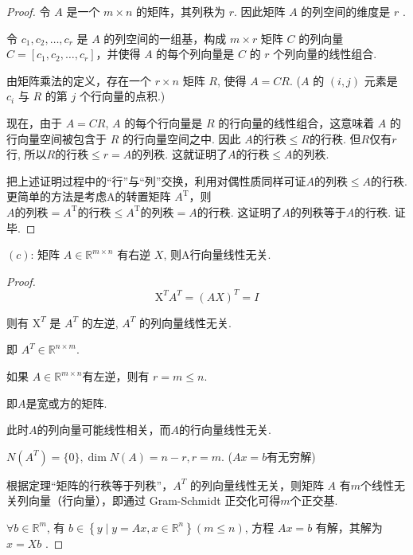 \begin{proof}
    令 $A$ 是一个 $m\times n$ 的矩阵，其列秩为 $r $. 因此矩阵 $A$ 的列空间的维度是 $r$ . 
    
    令 $c_1,c_2,\ldots,c_r$ 是 $A$ 的列空间的一组基，构成 $m \times r$ 矩阵 $C$ 的列向量 $C = [c_1,c_2,\ldots,c_r]$，并使得 $A$ 的每个列向量是 $C$ 的 $r$ 个列向量的线性组合. 
    
    由矩阵乘法的定义，存在一个 $r \times n$ 矩阵 $R$, 使得 $A = CR$. ($A$ 的 $(i,j)$ 元素是 $c_i$ 与 $R$ 的第 $j$ 个行向量的点积.)

现在，由于 $A = CR$, $A$ 的每个行向量是 $R$ 的行向量的线性组合，这意味着 $A$ 的行向量空间被包含于 $R$ 的行向量空间之中. 因此 $A 的行秩 \leq R的行秩$. 但$R$仅有$r$行, 所以$R的行秩 \leq r = A的列秩$. 这就证明了$A的行秩 \leq A的列秩$.

把上述证明过程中的“行”与“列”交换，利用对偶性质同样可证$A的列秩 \leq A的行秩$. 更简单的方法是考虑A的转置矩阵 $A^\mathrm{T}$，则$A的列秩 =  A^\mathrm{T}的行秩 \leq  A^\mathrm{T}的列秩 = A的行秩$. 这证明了$A$的列秩等于$A$的行秩. 证毕.
\end{proof}

\begin{theorem}
    $(c)$: 矩阵 $ A \in \mathbb{R}^{m \times n} $ 有右逆 $ X $, 则A行向量线性无关.
\end{theorem}

\begin{proof}
    $$ \mathrm{X}^{T} A^{T}=(A X)^{T}=I $$
    
    则有 $ \mathrm{X}^{T} $ 是 $ A^{T} $ 的左逆, $ A^{T} $ 的列向量线性无关.  

    即 $ A^{T} \in \mathbb{R}^{n \times m} $.
    
    \begin{corollary}
     如果 $ A \in \mathbb{R}^{m \times n} $有左逆，则有 $r= m \leq n  $. 

    即$A$是宽或方的矩阵. 

    此时$A$的列向量可能线性相关，而$A$的行向量线性无关. 
    
    $N(A^T) = \{0\}, \operatorname{dim} N(A) = n-r, r=m$. ($Ax=b$有无穷解) 
    \end{corollary}
    
    根据定理“矩阵的行秩等于列秩”，$ A^{T} $ 的列向量线性无关，则矩阵 $ A $ 有$m$个线性无关列向量（行向量），即通过 Gram-Schmidt 正交化可得$m$个正交基. 

    $ \forall b \in \mathbb{R}^{m} $, 有 $ b \in\left\{y \mid y=A x, x \in \mathbb{R}^{n}\right\} (m \leq n ) $, 方程 $ A x=b $ 有解，其解为 $ x=X b $ . 
\end{proof}


